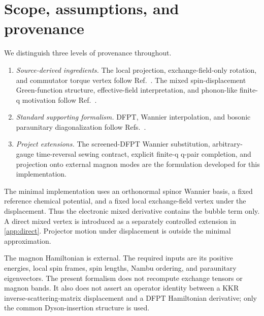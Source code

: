 \section{Scope, assumptions, and provenance}
\label{sec:scope}

We distinguish three levels of provenance throughout.

\begin{enumerate}
\item \emph{Source-derived ingredients.} The local projection, exchange-field-only rotation, and commutator torque vertex follow Ref.~\cite{MartinezCarracedo2023}. The mixed spin-displacement Green-function structure, effective-field interpretation, and phonon-like finite-q motivation follow Ref.~\cite{Mankovsky2023SLC}.
\item \emph{Standard supporting formalism.} DFPT, Wannier interpolation, and bosonic paraunitary diagonalization follow Refs.~\cite{Baroni2001,Giustino2007,Marzari2012,Pizzi2020,Colpa1978}.
\item \emph{Project extensions.} The screened-DFPT Wannier substitution, arbitrary-gauge time-reversal sewing contract, explicit finite-q q-pair completion, and projection onto external magnon modes are the formulation developed for this implementation.
\end{enumerate}

The minimal implementation uses an orthonormal spinor Wannier basis, a fixed reference chemical potential, and a fixed local exchange-field vertex under the displacement. Thus the electronic mixed derivative contains the bubble term only. A direct mixed vertex is introduced as a separately controlled extension in \cref{app:direct}. Projector motion under displacement is outside the minimal approximation.

The magnon Hamiltonian is external. The required inputs are its positive energies, local spin frames, spin lengths, Nambu ordering, and paraunitary eigenvectors. The present formalism does not recompute exchange tensors or magnon bands. It also does not assert an operator identity between a KKR inverse-scattering-matrix displacement and a DFPT Hamiltonian derivative; only the common Dyson-insertion structure is used.
